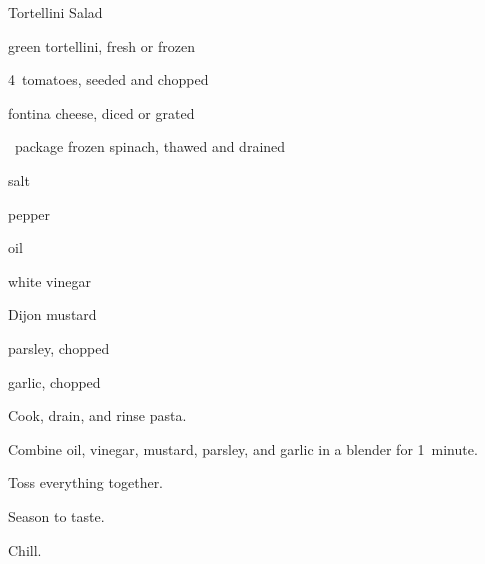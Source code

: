 \begin{recipe}{Tortellini Salad}{}{}

\begin{ingredients}
\item {} green tortellini, fresh or frozen
\item 4~tomatoes, seeded and chopped
\item \lbs{\half} fontina cheese, diced or grated
\item \half~package frozen spinach, thawed and drained
\item \tp{\half} salt
\item pepper
\item {} oil
\item \C{\half} white vinegar
\item {} Dijon mustard
\item {} parsley, chopped
\item \Tp{\half} garlic, chopped
\end{ingredients}

\begin{directions}
\item Cook, drain, and rinse pasta.
\item Combine oil, vinegar, mustard, parsley, and garlic in a blender for 1~minute.
\item Toss everything together.
\item Season to taste.
\item Chill.
\end{directions}

\end{recipe}

